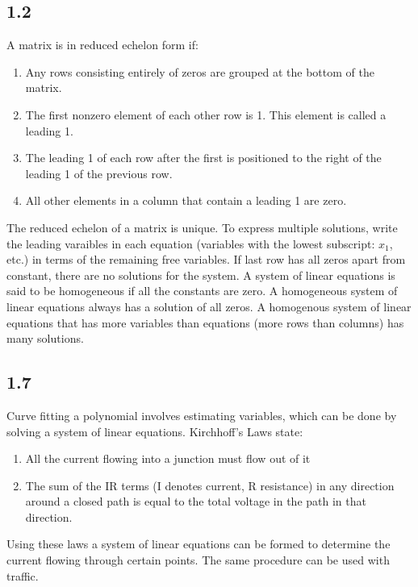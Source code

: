 \documentclass{article}
\begin{document}
    \subsection*{1.2}
    A matrix is in reduced echelon form if:
    \begin{enumerate}
        \item Any rows consisting entirely of zeros are grouped at the bottom of the matrix.
        \item The first nonzero element of each other row is 1. This element is called a leading 1. 
        \item The leading 1 of each row after the first is positioned to the right of the leading 1 of the previous row.
        \item All other elements in a column that contain a leading 1 are zero. 
    \end{enumerate}
    The reduced echelon of a matrix is unique. 
    To express multiple solutions, write the leading varaibles in each equation 
    (variables with the lowest subscript: $x_1$, etc.)  in terms of the remaining free variables.
    If last row has all zeros apart from constant, there are no solutions for the system.
    A system of linear equations is said to be homogeneous if all the constants are zero.  
    A homogeneous system of linear equations always has a solution of all zeros. 
    A homogenous system of linear equations that has more variables than equations (more rows than columns) 
    has many solutions. 

    \subsection*{1.7}
    Curve fitting a polynomial involves estimating variables, which can be done by solving a system of linear equations.
    Kirchhoff's Laws state:
    \begin{enumerate}
        \item All the current flowing into a junction must flow out of it
        \item The sum of the IR terms (I denotes current, R resistance) in any direction around a closed path
        is equal to the total voltage in the path in that direction. 
    \end{enumerate}
    Using these laws a system of linear equations can be formed to determine the current flowing through certain points.
    The same procedure can be used with traffic. 
\end{document}

